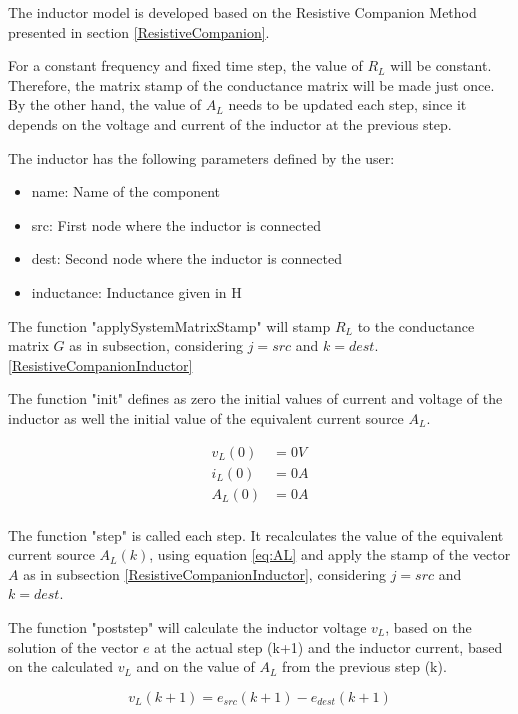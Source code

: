 The inductor model is developed based on the Resistive Companion Method presented in section \ref{ResistiveCompanion}.

For a constant frequency and fixed time step, the value of $R_L$ will be constant. Therefore, the matrix stamp of the conductance matrix will be made just once. By the other hand, the value of $A_L$ needs to be updated each step, since it depends on the voltage and current of the inductor at the previous step.

The inductor has the following parameters defined by the user:

\begin{itemize}
\item name: Name of the component
\item src: First node where the inductor is connected
\item dest: Second node where the inductor is connected
\item inductance: Inductance given in H
\end{itemize}

The function "applySystemMatrixStamp" will stamp $R_L$ to the conductance matrix $G$ as in subsection, considering $j=src$ and $k=dest$. \ref{ResistiveCompanionInductor}

The function "init" defines as zero the initial values of current and voltage of the inductor as well the initial value of the equivalent current source $A_L$.

\begin{align*}
v_L(0)&=0V \\
i_L(0)&=0A \\
A_L(0)&=0A \\
\end{align*}

The function "step" is called each step. It recalculates the value of the equivalent current source $A_L(k)$, using equation \ref{eq:AL} and apply the stamp of the vector $A$ as in subsection \ref{ResistiveCompanionInductor}, considering $j=src$ and $k=dest$.

The function "poststep" will calculate the inductor voltage $v_L$, based on the solution of the vector $e$ at the actual step (k+1) and the inductor current, based on the calculated $v_L$ and on the value of $A_L$ from the previous step (k).

\begin{equation} \label{eq:inductorVoltage}
v_L(k+1) = e_{src}(k+1) - e_{dest}(k+1)
\end{equation}

